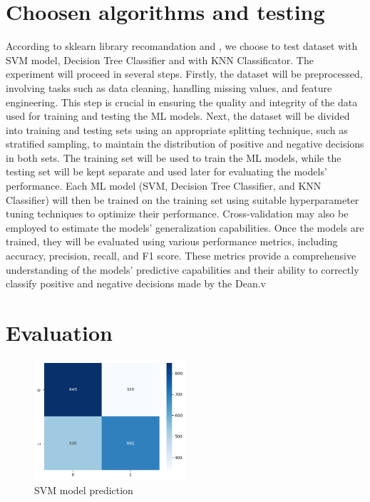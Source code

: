 \documentclass[conference]{IEEEtran}
\begin{document}
\section{Choosen algorithms and testing}
According to sklearn library recomandation \cite{sklearn} and \cite{towards_class}, we choose to test dataset with SVM model, Decision Tree Classifier and with KNN Classificator.
The experiment will proceed in several steps. Firstly, the dataset will be preprocessed, involving tasks such as data cleaning, handling missing values, and feature engineering. This step is crucial in ensuring the quality and integrity of the data used for training and testing the ML models.
Next, the dataset will be divided into training and testing sets using an appropriate splitting technique, such as stratified sampling, to maintain the distribution of positive and negative decisions in both sets. The training set will be used to train the ML models, while the testing set will be kept separate and used later for evaluating the models' performance.
Each ML model (SVM, Decision Tree Classifier, and KNN Classifier) will then be trained on the training set using suitable hyperparameter tuning techniques to optimize their performance. Cross-validation may also be employed to estimate the models' generalization capabilities.
Once the models are trained, they will be evaluated using various performance metrics, including accuracy, precision, recall, and F1 score. These metrics provide a comprehensive understanding of the models' predictive capabilities and their ability to correctly classify positive and negative decisions made by the Dean.v

\section{Evaluation}

\begin{figure}
\includegraphics[width=0.5\textwidth]{img/svm_pred.png}
\caption{SVM model prediction}
\label{fig}
\end{figure}
\end{document}
